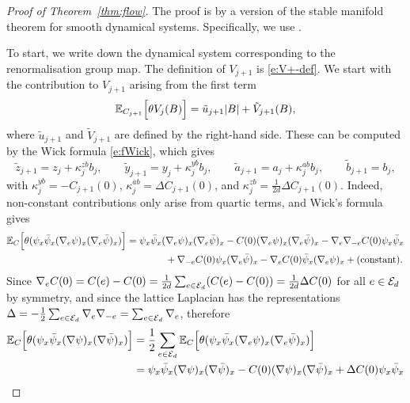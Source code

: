 \documentclass[11pt]{amsart}
\numberwithin{equation}{section}
\numberwithin{theorem}{section}
\newcommand{\1}{{\bf 1}}
\begin{document}
\begin{proof}[Proof of Theorem~\ref{thm:flow}]
  The proof is by a version of the stable manifold theorem for
  smooth dynamical systems. Specifically, we use \cite[Theorem~2.16]{MR2523458}.

  To start, we write down the dynamical system corresponding
  to the renormalisation group map. The definition of $V_{j+1}$ is
  \eqref{e:V+-def}.  We start with the contribution to $V_{j+1}$
  arising from the first term
  \begin{equation}
  \label{eq:E}
    \mathbb{E}_{C_{j+1}}\Bigl[{\theta V_{j}(B)}\Bigr] = \tilde u_{j+1}|B|+\tilde V_{j+1}(B),
  \end{equation}
  where $\tilde u_{j+1}$ and $\tilde V_{j+1}$ are defined by the right-hand side. These
  can be computed by the Wick formula \eqref{e:fWick}, which gives
  \begin{equation}
    \label{eq:tildeflow}
    \tilde z_{j+1} = z_{j} + \kappa_j^{zb}b_j, 
    \qquad \tilde y_{j+1} = y_{j} + \kappa_{j}^{yb}b_{j},
    \qquad \tilde a_{j+1} = a_{j} + \kappa_{j}^{ab}b_{j},
    \qquad \tilde b_{j+1} = b_{j},
  \end{equation}
  with $\kappa_{j}^{yb} = -C_{j+1}(0)$,
  $\kappa_{j}^{ab}=\Delta C_{j+1}(0)$,
  and $\kappa_j^{zb} = \frac{1}{2d}\Delta C_{j+1}(0)$. Indeed,
  non-constant contributions only arise from quartic terms, and Wick's formula gives
  \begin{align}
    \mathbb{E}_C\Bigl[{\theta(\psi_x\bar\psi_x(\nabla_e\psi)_x(\nabla_e\bar\psi)_x)}\Bigr]
    &=
      \psi_x\bar\psi_x(\nabla_e\psi)_x(\nabla_e\bar\psi)_x
      -C(0) (\nabla_e\psi)_x(\nabla_e\bar\psi)_x - \nabla_e\nabla_{-e} C(0) \psi_x\bar\psi_x
    \nonumber\\
    &\qquad\qquad 
    + \nabla_{-e}C(0)\psi_x(\nabla_e\bar\psi)_x
    - \nabla_eC(0)\bar\psi_x(\nabla_e\psi)_x + \text{(constant)}.
  \end{align}
  Since $\nabla_e C(0) = C(e)-C(0) = \frac{1}{2d}\sum_{e\in \mathcal E_d} (C(e)-C(0))= \frac{1}{2d}\Delta C(0)$
  for all $e\in \mathcal E_d$ by symmetry,
  and since the lattice Laplacian has the representations $\Delta = -\frac12 \sum_{e\in\mathcal E_d}\nabla_e\nabla_{-e} = \sum_{e\in\mathcal E_d} \nabla_e$,
  therefore
  \begin{align}
    \E_C\qB{\theta(\psi_x\bar\psi_x(\nabla\psi)_x(\nabla\bar\psi)_x)}
    &= \frac12 \sum_{e\in\cE_d}       \E_C \qB{\theta(\psi_x\bar\psi_x(\nabla_e\psi)_x(\nabla_e\bar\psi)_x)}
      \nnb
    &=
      \psi_x\bar\psi_x(\nabla\psi)_x(\nabla\bar\psi)_x
      -C(0)(\nabla\psi)_x(\nabla\bar\psi)_x + \Delta C(0)\psi_x\bar\psi_x
      \nnb

\end{align}
\end{proof}
\end{document}
